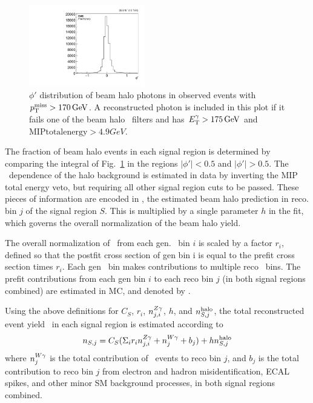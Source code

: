 \begin{figure}[tbp]
  \begin{center}
    \includegraphics[width=0.45\textwidth]{figures/noncol/phiHaloFolded.pdf}
    \caption{
      $\phi'$ distribution of beam halo photons in observed events with $\MET > 170\unit{GeV}$. A reconstructed photon is included
      in this plot if it fails one of the beam halo \MET\ filters and has $\ETgamma > 175\unit{GeV}$ and
      $\mathrm{MIP total energy}>4.9\unit{GeV}$.
    }
    \label{fig:halophi}
  \end{center}
\end{figure}

The fraction of beam halo events in each signal region is determined by comparing the integral of Fig.~\ref{fig:halophi} in the regions
$|\phi'| < 0.5$ and $|\phi'| > 0.5$. The \ETgamma\ dependence of the halo background is estimated in data
by inverting the MIP total energy veto, but requiring all other signal region cuts to be passed. These pieces of information are encoded in 
\nhalo[,j], the estimated beam halo prediction in reco. bin $j$ of the signal region $S$. This is multiplied by a
single parameter $h$ in the fit, which governs the overall normalization of the beam halo yield.

The overall normalization of \zinvg\ from each gen. \pTgamma\ bin $i$ is scaled by a factor $r_{i}$, defined so that
the postfit cross section of gen bin i is equal to the prefit cross section times $r_{i}$.
Each gen \pTgamma\ bin makes contributions to multiple reco \ETgamma\ bins.
The prefit contributions from each gen bin $i$ to each reco bin $j$ (in both signal regions combined) are estimated in MC, and denoted by \nZg[j,i].

Using the above definitions for $C_{S}$, $r_{i}$, $\nZg[j,i]$, $h$, and $\nhalo[,j]$,
the total reconstructed event yield \nS\ in each signal region is estimated according to
\begin{equation}
  \nS[,j] = C_{S} (\Sigma_{i}r_{i}\nZg[j,i] + \nWg[j] + b_{j}) + h\nhalo[,j]
\end{equation}
where $\nWg[j]$ is the total contribution of \wlng\ events to reco bin $j$, and $b_{j}$ is the total contribution to reco bin $j$ from
electron and hadron misidentification, ECAL spikes, and other minor SM background processes, in both signal regions combined.

